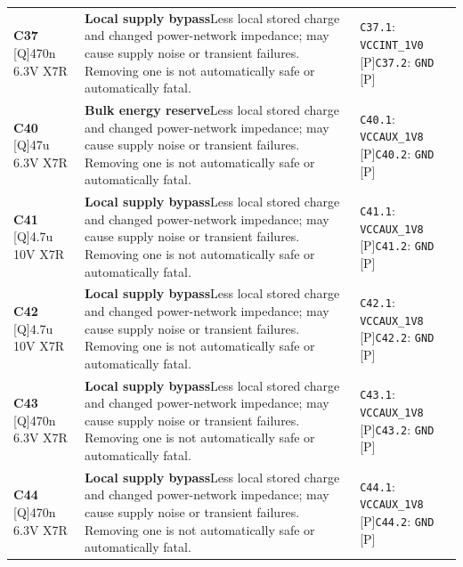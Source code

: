 \documentclass[11pt,a4paper]{article}
\begin{document}
\begin{longtable}{@{}P{27mm}P{77mm}P{62mm}@{}}
\textbf{C37} [Q]\newline 470n 6.3V X7R & \textbf{Local supply bypass}\newline Less local stored charge and changed power-network impedance; may cause supply noise or transient failures. Removing one is not automatically safe or automatically fatal. & \nolinkurl{C37.1}: \nolinkurl{VCCINT_1V0} [P]\newline \nolinkurl{C37.2}: \nolinkurl{GND} [P] \\
\textbf{C40} [Q]\newline 47u 6.3V X7R & \textbf{Bulk energy reserve}\newline Less local stored charge and changed power-network impedance; may cause supply noise or transient failures. Removing one is not automatically safe or automatically fatal. & \nolinkurl{C40.1}: \nolinkurl{VCCAUX_1V8} [P]\newline \nolinkurl{C40.2}: \nolinkurl{GND} [P] \\
\textbf{C41} [Q]\newline 4.7u 10V X7R & \textbf{Local supply bypass}\newline Less local stored charge and changed power-network impedance; may cause supply noise or transient failures. Removing one is not automatically safe or automatically fatal. & \nolinkurl{C41.1}: \nolinkurl{VCCAUX_1V8} [P]\newline \nolinkurl{C41.2}: \nolinkurl{GND} [P] \\
\textbf{C42} [Q]\newline 4.7u 10V X7R & \textbf{Local supply bypass}\newline Less local stored charge and changed power-network impedance; may cause supply noise or transient failures. Removing one is not automatically safe or automatically fatal. & \nolinkurl{C42.1}: \nolinkurl{VCCAUX_1V8} [P]\newline \nolinkurl{C42.2}: \nolinkurl{GND} [P] \\
\textbf{C43} [Q]\newline 470n 6.3V X7R & \textbf{Local supply bypass}\newline Less local stored charge and changed power-network impedance; may cause supply noise or transient failures. Removing one is not automatically safe or automatically fatal. & \nolinkurl{C43.1}: \nolinkurl{VCCAUX_1V8} [P]\newline \nolinkurl{C43.2}: \nolinkurl{GND} [P] \\
\textbf{C44} [Q]\newline 470n 6.3V X7R & \textbf{Local supply bypass}\newline Less local stored charge and changed power-network impedance; may cause supply noise or transient failures. Removing one is not automatically safe or automatically fatal. & \nolinkurl{C44.1}: \nolinkurl{VCCAUX_1V8} [P]\newline \nolinkurl{C44.2}: \nolinkurl{GND} [P] \\

\end{longtable}
\end{document}
